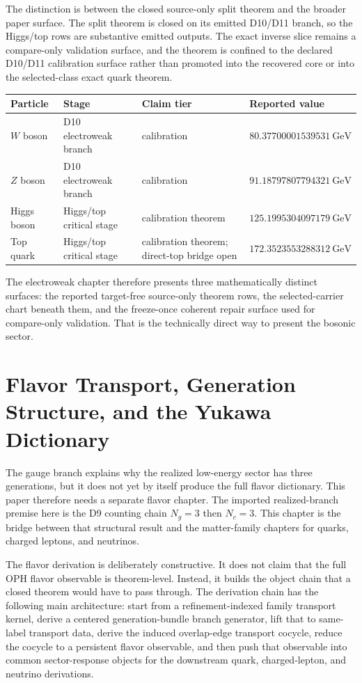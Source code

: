 \documentclass[11pt]{article}
\begin{document}
The distinction is between the closed source-only split theorem and the broader paper surface. The
split theorem is closed on its emitted D10/D11 branch, so the Higgs/top rows are
substantive emitted outputs. The exact inverse slice remains a compare-only validation surface, and the theorem is confined to the declared D10/D11 calibration surface rather than promoted into the recovered core or into the selected-class exact quark theorem.

\begin{table}[h]
\centering
\small
\begin{tabular}{@{}llll@{}}
\toprule
Particle & Stage & Claim tier & Reported value \\
\midrule
\(W\) boson & D10 electroweak branch & calibration & \(80.37700001539531~\mathrm{GeV}\) \\
\(Z\) boson & D10 electroweak branch & calibration & \(91.18797807794321~\mathrm{GeV}\) \\
Higgs boson & Higgs/top critical stage & calibration theorem & \(125.1995304097179~\mathrm{GeV}\) \\
Top quark & Higgs/top critical stage & calibration theorem; direct-top bridge open & \(172.3523553288312~\mathrm{GeV}\) \\
\bottomrule
\end{tabular}
\end{table}

The electroweak chapter therefore presents three mathematically distinct surfaces: the reported
target-free source-only theorem rows, the selected-carrier chart beneath them, and the freeze-once
coherent repair surface used for compare-only validation. That is the technically direct way to
present the bosonic sector.

\section{Flavor Transport, Generation Structure, and the Yukawa Dictionary}

The gauge branch explains why the realized low-energy sector has three generations, but it does
not yet by itself produce the full flavor dictionary. This paper therefore needs a
separate flavor chapter. The imported realized-branch premise here is the D9 counting chain
\(N_g=3\) then \(N_c=3\). This chapter is the bridge between that structural result and the
matter-family chapters for quarks, charged leptons, and neutrinos.

The flavor derivation is deliberately constructive. It does not claim that the full
OPH flavor observable is theorem-level. Instead, it builds the object chain that a
closed theorem would have to pass through. The derivation chain has the following main
architecture: start from a refinement-indexed family transport kernel, derive a centered
generation-bundle branch generator, lift that to same-label transport data, derive the induced
overlap-edge transport cocycle, reduce the cocycle to a persistent flavor observable, and then
push that observable into common sector-response objects for the downstream quark, charged-lepton,
and neutrino derivations.
\end{document}
